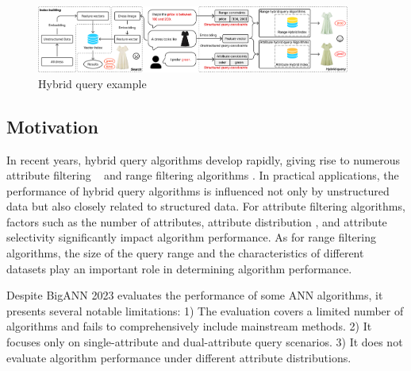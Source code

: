 \documentclass[sigconf, nonacm]{acmart}
\begin{document}
	\begin{figure}
		\centering
		
		\includegraphics[width=0.92\textwidth]{figures/hybrid ANNS.pdf}
		\caption{Hybrid query example}
		
		\label{fig:hybrid ANNS}
	\end{figure}
	\subsection{Motivation}
	
	In recent years, hybrid query algorithms develop rapidly, giving rise to numerous attribute filtering ~\cite{NHQ,diskann} and range filtering algorithms \cite{serf,iRangeGraph}. In practical applications, the performance of hybrid query algorithms is influenced not only by unstructured data but also closely related to structured data. For attribute filtering algorithms, factors such as the number of attributes, attribute distribution \cite{UNG}, and attribute  selectivity \textcolor{orange}{\cite{analyticdb,milvus}} significantly impact algorithm performance. As for range filtering algorithms, the size of the query range and the characteristics of different datasets  play an important role in determining algorithm performance.
	
	Despite BigANN 2023 \cite{bigann2023} evaluates the performance of some ANN algorithms, it presents several notable limitations:
	1) The evaluation covers a limited number of algorithms and fails to comprehensively include mainstream methods. 
	2) It focuses only on single-attribute and dual-attribute query scenarios. 
	3) It does not evaluate algorithm performance under different attribute distributions. 
	
\end{document}
